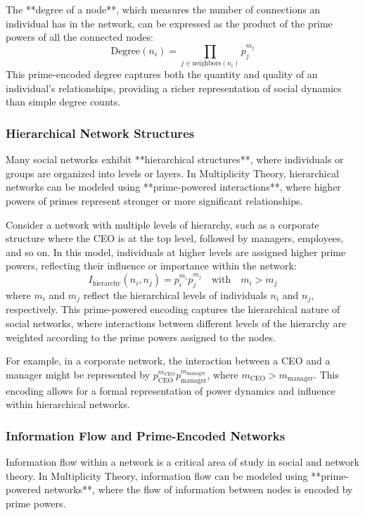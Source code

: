 \documentclass[12pt]{article}
\begin{document}
The **degree of a node**, which measures the number of connections an individual has in the network, can be expressed as the product of the prime powers of all the connected nodes:
\[
\text{Degree}(n_i) = \prod_{j \in \text{neighbors}(n_i)} p_j^{m_j}
\]
This prime-encoded degree captures both the quantity and quality of an individual's relationships, providing a richer representation of social dynamics than simple degree counts.

\subsubsection{Hierarchical Network Structures}

Many social networks exhibit **hierarchical structures**, where individuals or groups are organized into levels or layers. In Multiplicity Theory, hierarchical networks can be modeled using **prime-powered interactions**, where higher powers of primes represent stronger or more significant relationships.

Consider a network with multiple levels of hierarchy, such as a corporate structure where the CEO is at the top level, followed by managers, employees, and so on. In this model, individuals at higher levels are assigned higher prime powers, reflecting their influence or importance within the network:
\[
I_{\text{hierarchy}}(n_i, n_j) = p_i^{m_i} p_j^{m_j} \quad \text{with} \quad m_i > m_j
\]
where \( m_i \) and \( m_j \) reflect the hierarchical levels of individuals \( n_i \) and \( n_j \), respectively. This prime-powered encoding captures the hierarchical nature of social networks, where interactions between different levels of the hierarchy are weighted according to the prime powers assigned to the nodes.

For example, in a corporate network, the interaction between a CEO and a manager might be represented by \( p_{\text{CEO}}^{m_{\text{CEO}}} p_{\text{manager}}^{m_{\text{manager}}} \), where \( m_{\text{CEO}} > m_{\text{manager}} \). This encoding allows for a formal representation of power dynamics and influence within hierarchical networks.

\subsubsection{Information Flow and Prime-Encoded Networks}

Information flow within a network is a critical area of study in social and network theory. In Multiplicity Theory, information flow can be modeled using **prime-powered networks**, where the flow of information between nodes is encoded by prime powers.
\end{document}
